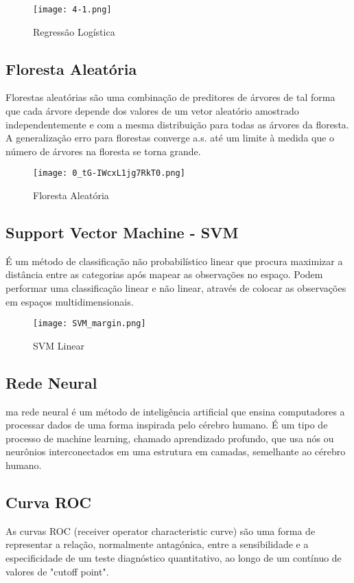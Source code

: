 \begin{figure}[!h]
    \centering
    \texttt{[image: 4-1.png]}
    \caption{Regressão Logística}
\end{figure}

\subsection{Floresta Aleatória}
Florestas aleatórias são uma combinação de preditores de árvores de tal forma que cada árvore depende dos valores de um
vetor aleatório amostrado independentemente e com a mesma distribuição para todas as árvores da floresta. A generalização
erro para florestas converge a.s. até um limite à medida que o número de árvores na floresta se torna grande. 

\begin{figure}[!h]
    \centering
    \texttt{[image: 0\_tG-IWcxL1jg7RkT0.png]}
    \caption{Floresta Aleatória}
\end{figure}

\subsection{Support Vector Machine - SVM}
É um método de classificação não probabilístico linear que
procura maximizar a distância entre as categorias após mapear 
as observações no espaço. Podem performar uma classificação linear e não 
linear, através de colocar as observações em espaços multidimensionais. 

\begin{figure}[!h]
    \centering
    \texttt{[image: SVM\_margin.png]}
    \caption{SVM Linear}
\end{figure}

\clearpage


\subsection{Rede Neural}
ma rede neural é um método de inteligência artificial que ensina 
computadores a processar dados de uma forma inspirada pelo cérebro humano. 
É um tipo de processo de machine learning, chamado aprendizado profundo, 
que usa nós ou neurônios interconectados em uma estrutura em camadas, semelhante ao cérebro humano.

\subsection{Curva ROC}
As curvas ROC (receiver operator characteristic curve) são uma forma de representar a relação, 
normalmente antagónica, entre a sensibilidade e a especificidade 
de um teste diagnóstico quantitativo, ao longo de um contínuo de valores de "cutoff point".

